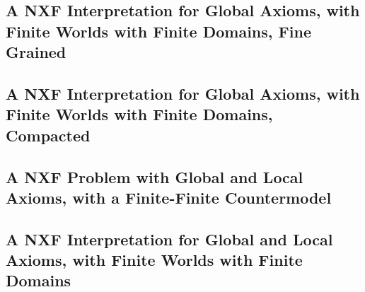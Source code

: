 \documentclass{easychair}
\begin{document}
\newpage
\subsection{A NXF Interpretation for Global Axioms, with Finite Worlds with Finite Domains, Fine Grained}
\begin{small}

\end{small}

\newpage
\subsection{A NXF Interpretation for Global Axioms, with Finite Worlds with Finite Domains, Compacted}
\begin{small}

\end{small}

\newpage
\subsection{A NXF Problem with Global and Local Axioms, with a Finite-Finite Countermodel}
\begin{small}

\end{small}

\newpage
\subsection{A NXF Interpretation for Global and Local Axioms, with Finite Worlds with Finite Domains}
\begin{small}

\end{small}

\end{document}
